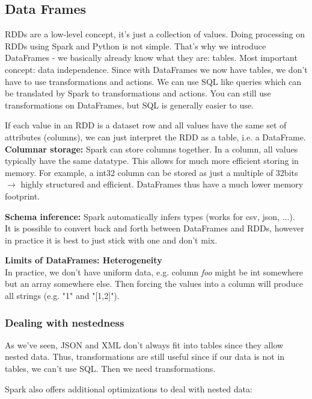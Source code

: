 \documentclass[11pt,oneside,a4paper]{article}
\begin{document}
\subsection{Data Frames}

RDDs are a low-level concept, it's just a collection of values. Doing processing on RDDs using Spark and Python is not simple. That's why we introduce DataFrames - we basically already know what they are: tables. Most important concept: data independence. Since with DataFrames we now have tables, we don't have to use transformations and actions. We can use SQL like queries which can be translated by Spark to transformations and actions. You can still use transformations on DataFrames, but SQL is generally easier to use.

If each value in an RDD is a dataset row and all values have the same set of attributes (columns), we can just interpret the RDD as a table, i.e. a DataFrame.\\

\textbf{Columnar storage:} Spark can store columns together. In a column, all values typically have the same datatype. This allows for much more efficient storing in memory. For example, a int32 column can be stored as just a multiple of 32bits $\rightarrow$ highly structured and efficient. DataFrames thus have a much lower memory footprint.

\textbf{Schema inference:} Spark automatically infers types (works for csv, json, ...).\\

It is possible to convert back and forth between DataFrames and RDDs, however in practice it is best to just stick with one and don't mix.

\textbf{Limits of DataFrames: Heterogeneity}\\
In practice, we don't have uniform data, e.g. column \textit{foo} might be int somewhere but an array somewhere else. Then forcing the values into a column will produce all strings (e.g. "1" and "[1,2]").

\subsubsection{Dealing with nestedness}

As we've seen, JSON and XML don't always fit into tables since they allow nested data. Thus, transformations are still useful since if our data is not in tables, we can't use SQL. Then we need transformations.

Spark also offers additional optimizations to deal with nested data:
\end{document}
